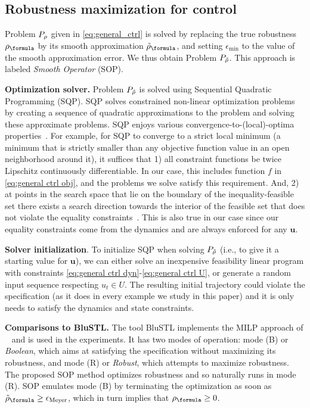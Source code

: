 \subsection{Robustness maximization for control}
\label{sec:toy example}
Problem $P_\rho$ given in \eqref{eq:general_ctrl} is solved by replacing the true robustness $\robf$ by its smooth approximation $\srobf$, and setting $\epsilon_{\text{min}}$ to the value of the smooth approximation error.
We thus obtain Problem $P_{\tilde{\rho}}$. 
This approach is labeled \textit{Smooth Operator} (SOP).

\textbf{Optimization solver.}
Problem $P_{\tilde{\rho}}$ is solved using Sequential Quadratic Programming (SQP).
SQP solves constrained non-linear optimization problems by creating a sequence of quadratic approximations to the problem and solving these approximate problems.
SQP enjoys various convergence-to-(local)-optima properties~\cite[Section 2.9]{Polak97_Optim}.
For example, for SQP to converge to a strict local minimum (a minimum that is strictly smaller than any objective function value in an open neighborhood around it), it suffices that 
1) all constraint functions be twice Lipschitz continuously differentiable. 
In our case, this includes function $f$ in \eqref{eq:general ctrl obj}, and the problems we solve satisfy this requirement.
And, 
2) at points in the search space that lie on the boundary of the inequality-feasible set
there exists a search direction towards the interior of the feasible set that does not violate the equality constraints~\cite[Assumption 2.9.1]{Polak97_Optim}. 
This is also true in our case since our equality constraints come from the dynamics and are always enforced for any $\mathbf{u}$.

\textbf{Solver initialization}.
To initialize SQP when solving $P_{\tilde{\rho}}$ (i.e., to give it a starting value for $\mathbf{u}$), we can either solve an inexpensive feasibility linear program with constraints \eqref{eq:general ctrl dyn}-\eqref{eq:general ctrl U}, 
or generate a random input sequence respecting $u_t \in U$. 
The resulting initial trajectory could violate the specification (as it does in every example we study in this paper) and it is only needs to satisfy the dynamics and state constraints.

\textbf{Comparisons to BluSTL.}
The tool BluSTL implements the MILP approach of ~\cite{Raman14_MPCSTL} and is used in the experiments.
It has two modes of operation: mode (B) or \textit{Boolean}, which aims at satisfying the specification without maximizing its robustness, and mode (R) or \textit{Robust}, which attempts to maximize robustness. 
The proposed SOP method optimizes robustness and so naturally runs in mode (R).
SOP emulates mode (B) by terminating the optimization as soon as $\srobf \geq \epsilon_{\text{Meyer}}$, which in turn implies that $\rob_{\formula} \geq 0$. 



%
